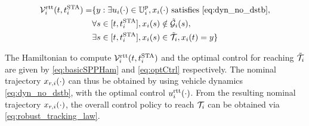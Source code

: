 \vspace{-1.25em}
\begin{equation}
\label{eq:rttBRS}
\begin{aligned}
\mathcal{V}_i^\text{rtt}(t, t^\text{STA}_i) = & \{y: \exists u_i(\cdot) \in \mathbb{U}^p_i, x_i(\cdot) \text{ satisfies \eqref{eq:dyn_no_dstb}},\\
&\forall s \in [t, t^\text{STA}_i], x_i(s) \notin \tilde{\mathcal{G}}_i(s), \\
& \exists s \in [t, t^\text{STA}_i], x_i(s) \in \tilde{\mathcal{T}}_i, x_i(t) = y\}
\end{aligned}
\end{equation}

The Hamiltonian to compute $\mathcal{V}_i^\text{rtt}(t, t^\text{STA}_i)$ and the optimal control for reaching $\tilde{\mathcal{T}}_i$ are given by \eqref{eq:basicSPPHam} and \eqref{eq:optCtrl} respectively.
%
The nominal trajectory $x_{r,i}(\cdot)$ can thus be obtained by using vehicle dynamics \eqref{eq:dyn_no_dstb}, with the optimal control  $u_i^\text{rtt}(\cdot)$. From the resulting nominal trajectory $x_{r,i}(\cdot)$, the overall control policy to reach $\mathcal{T}_i$ can be obtained via \eqref{eq:robust_tracking_law}.